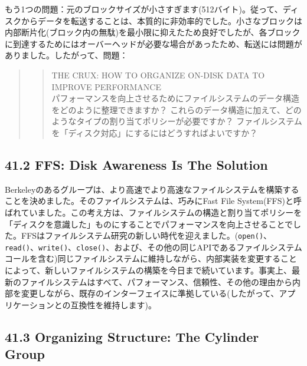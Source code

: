 もう1つの問題：元のブロックサイズが小さすぎます(512バイト)。従って、ディスクからデータを転送することは、本質的に非効率的でした。小さなブロックは内部断片化(ブロック内の無駄)を最小限に抑えたため良好でしたが、各ブロックに到達するためにはオーバーヘッドが必要な場合があったため、転送には問題がありました。したがって、問題：

\begin{quote}
\begin{quote}
THE CRUX: HOW TO ORGANIZE ON-DISK DATA TO IMPROVE PERFORMANCE\\
パフォーマンスを向上させるためにファイルシステムのデータ構造をどのように整理できますか？
これらのデータ構造に加えて、どのようなタイプの割り当てポリシーが必要ですか？
ファイルシステムを「ディスク対応」にするにはどうすればよいですか？
\end{quote}
\end{quote}

\hypertarget{ffs-disk-awareness-is-the-solution}{%
\subsection*{41.2 FFS: Disk Awareness Is The
Solution}\label{ffs-disk-awareness-is-the-solution}}

Berkeleyのあるグループは、より高速でより高速なファイルシステムを構築することを決めました。そのファイルシステムは、巧みにFast
File
System(FFS)と呼ばれていました。この考え方は、ファイルシステムの構造と割り当てポリシーを「ディスクを意識した」ものにすることでパフォーマンスを向上させることでした。FFSはファイルシステム研究の新しい時代を迎えました。(\texttt{open()}、\texttt{read()}、\texttt{write()}、\texttt{close()}、および、その他の同じAPIであるファイルシステムコールを含む)同じファイルシステムに維持しながら、内部実装を変更することによって、新しいファイルシステムの構築を今日まで続いています。事実上、最新のファイルシステムはすべて、パフォーマンス、信頼性、その他の理由から内部を変更しながら、既存のインターフェイスに準拠している(したがって、アプリケーションとの互換性を維持します)。

\hypertarget{organizing-structure-the-cylinder-group}{%
\subsection*{41.3 Organizing Structure: The Cylinder
Group}\label{organizing-structure-the-cylinder-group}}

